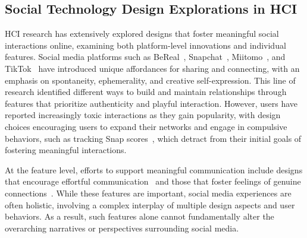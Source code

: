 



\subsection{Social Technology Design Explorations in HCI}

HCI research has extensively explored designs that foster meaningful social interactions online, examining both platform-level innovations and individual features. Social media platforms such as BeReal~\cite{HinikerKim-2024-SharingDesign-x}, Snapchat~\cite{Bayer2016-fa}, Miitomo~\cite{KaufmanKasunic-2017-BeMeApplication-h}, and TikTok~\cite{Barta2021-yh, Schaadhardt2023-jj} have introduced unique affordances for sharing and connecting, with an emphasis on spontaneity, ephemerality, and creative self-expression. This line of research identified different ways to build and maintain relationships through features that prioritize authenticity and playful interaction. However, users have reported increasingly toxic interactions as they gain popularity, with design choices encouraging users to expand their networks and engage in compulsive behaviors, such as tracking Snap scores~\cite{chambers2022s, van2023snapchat}, which detract from their initial goals of fostering meaningful interactions. 

At the feature level, efforts to support meaningful communication include designs that encourage effortful communication~\cite{LiuFannie2021SOUt, LiuZhang-2022-AuggieEncouragingExperiences-n} and those that foster feelings of genuine connections~\cite{Stepanova2022-vh}. While these features are important, social media experiences are often holistic, involving a complex interplay of multiple design aspects and user behaviors. As a result, such features alone cannot fundamentally alter the overarching narratives or perspectives surrounding social media.

